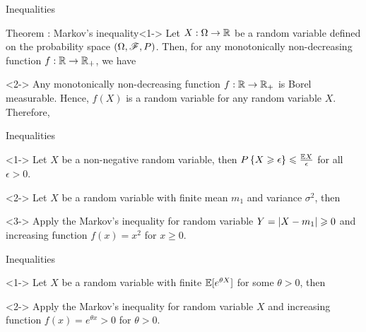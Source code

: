 \documentclass[12pt,aspectratio=169]{beamer}
\begin{document}
\begin{frame}{Inequalities}
\begin{block}{Theorem : Markov's inequality}<1->
Let $X: \Omega \to \mathbb{R}$ be a random variable defined on the probability space $(\Omega, \mathscr{F}, P)$. 
Then, for any monotonically non-decreasing function $f: \mathbb{R} \to \mathbb{R}_+$, we have 
\end{block}

\begin{Proof}<2->
Any monotonically non-decreasing function $f: \mathbb{R} \to \mathbb{R}_+$ is Borel measurable. 
Hence,  $f(X)$ is a random variable for any random variable $X$. 
Therefore, 
\end{Proof}
\end{frame}

\begin{frame}{Inequalities}
\begin{cor}[Markov]<1->
Let $X$ be a non-negative random variable, then $P\left\{X \geqslant \epsilon\right\} \leqslant \frac{\mathbb{E} X}{\epsilon}$ for all $\epsilon  > 0$.
\end{cor}
\begin{cor}[Chebychev]<2->
Let $X$ be a random variable with finite mean $m_1$ and variance $\sigma^2$, 
then 
\end{cor}
\begin{Proof}<3->
Apply the Markov's inequality for random variable $Y = \left\lvert X-m_1\right\rvert \geqslant 0$ and increasing function $f(x) = x^2$ for $x \ge 0$. 
\end{Proof}
\end{frame}

\begin{frame}{Inequalities}
\begin{cor}[Chernoff]<1->
Let $X$ be a random variable with finite $\mathbb{E}[e^{\theta X}]$ for some $\theta>0$, 
then 
\end{cor}
\begin{Proof}<2->
Apply the Markov's inequality for random variable $X$ and increasing function $f(x) = e^{\theta x} > 0$ for $\theta > 0$. 
\end{Proof}
\end{frame}
\end{document}
